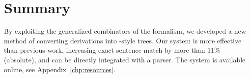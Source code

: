 \section{Summary}

By exploiting the generalized combinators of the \ccg formalism, we developed a new method of converting \ccg derivations into \ptb-style trees.
Our system is more effective than previous work, increasing exact sentence match by more than 11\% (absolute), and can be directly integrated with a \ccg parser.
The system is available online, see Appendix~\ref{chp:resources}.






